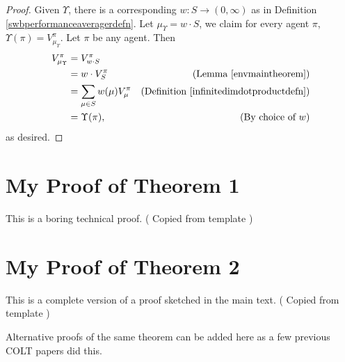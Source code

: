 \documentclass[twoside]{article}
\begin{document}
\begin{proof}
    Given $\Upsilon$, there is a corresponding $w:S\to(0,\infty)$ as in
    Definition \ref{swbperformanceaveragerdefn}.
    Let $\mu_\Upsilon=w\cdot S$, we claim for every agent $\pi$,
    $\Upsilon(\pi)=V^\pi_{\mu_\Upsilon}$. Let $\pi$ be any agent. Then
    \begin{align*}
        V^\pi_{\mu_\Upsilon}
            &= V^\pi_{w\cdot S}\\
            &= w\cdot V^\pi_{S}
                &\mbox{(Lemma \ref{envmaintheorem})}\\
            &= \sum_{\mu\in S}w(\mu)V^\pi_\mu
                &\mbox{(Definition \ref{infinitedimdotproductdefn})}\\
            &= \Upsilon(\pi),
                &\mbox{(By choice of $w$)}
    \end{align*}
    as desired.
\end{proof}



\appendix

\section{My Proof of Theorem 1}

This is a boring technical proof. ( Copied from template )

\section{My Proof of Theorem 2}

This is a complete version of a proof sketched in the main text.
( Copied from template )

 Alternative proofs of the same theorem can be added here as a few previous COLT papers did this.
\end{document}
